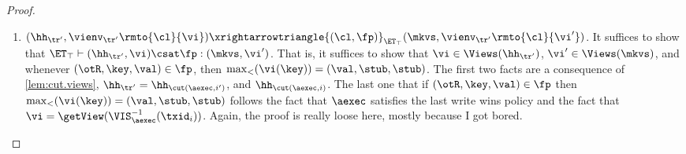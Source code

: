 \begin{proof}
\begin{itemize}
\begin{enumerate}
\begin{itemize}
\item There exists an index $j : 1 \leq j \leq i'$ and an integer $h \in \Nat$ such that $\txid_{j} = \txid_{\cl}^{h}$. 
Without loss of generality, let $j$ be the largest such index. 
It follows that the last transition in $\tr'$ of the form $(\stub, \stub) \xrightarrow{(\cl, \fp_{j})} (\stub, \vienv_{\mathsf{pre}})$ 
is such that $\vienv_{\mathsf{pre}}(\cl) = \getView(\aexec, \T_{\mathsf{pre}})$, 
for some $\T_{\mathsf{pre}} \subseteq \VIS^{-1}_{\aexec}(\txid_{i}) \cap (\AR^{-1}_{\aexec})?(\txid_{j})$.
This is because $\nextTx(\cl, \aexec, j)$  is defined and equal to $\txid_{i}$. 
Furthermore, because the trace $\tr'$ is in normal form by construction, 
in $\tr'$ a transition of the form $(\stub, \stub) \xrightarrowtriangle{(\cl, \varepsilon)}_{\ET_{\top}} (\stub, \stub)$ 
is always followed by a transition of the form $(\stub, \stub) \xrightarrowtriangle{(\cl, \fp')}_{\ET_{\top}} (\stub, \stub)$. 
Because we assume that the last transition where client $\cl$ executes a transaction in $\tr'$ 
has the form $(\stub, \stub) \xrightarrowtriangle{(\cl, \fp_{j})}_{\ET_{\top}} (\stub, \vienv_{\mathsf{pre}})$, 
then the latter is also the last transition for client $\cl$ in $\tr'$ 
(i.e. including both execution of transactions and view updates). 
It follows that $\vienv_{\tr'}(\cl) = \vienv_{\mathsf{pre}}(\cl)$, and in particular 
$\vienv_{\tr'}(\cl) = \getView(\aexec, \T_{\mathsf{pre}})$. By definition, 
$\T_{\mathsf{pre}} \subseteq  \VIS^{-1}_{\aexec}(\txid_{i}) \cap (\AR^{-1}_{\aexec})?(\txid_{j}) 
\subseteq \VIS^{-1}_{\aexec}(\txid_{i})$. By  \cref{lem:getView.monotone}, 
we have that $\vienv_{\tr'}(\cl) = \getView(\aexec, \T_{\mathsf{pre}}) \viewleq 
\getView(\aexec, \VIS^{-1}_{\aexec}(\txid_{i})) = \vi$, as we wanted to prove.
\ac{Note: this is more a sketch, rather than a real proof. A Proposition giving an explicit form to the 
structure of any $\tr \in \KVtrace(\ET_{\top}, \aexec)$ would be helpful for a more rigorous proof here.}
\end{itemize}


\item $(\hh_{\tr'}, \vienv_{\tr'}\rmto{\cl}{\vi}) \xrightarrowtriangle{(\cl, \fp)}_{\ET_{\top}} (\mkvs,  \vienv_{\tr'}\rmto{\cl}{\vi'})$. 
    It suffices to show that $\ET_{\top} \vdash (\hh_{\tr'}, \vi) \csat \fp: (\mkvs,\vi')$. 
That is, it suffices to show that $\vi \in \Views(\hh_{\tr'})$, $\vi' \in \Views(\mkvs)$, 
and whenever $(\otR, \key, \val) \in \fp$, then $\max_{<}(\vi(\key)) = (\val, \stub, \stub)$. 
The first two facts are a consequence of \cref{lem:cut.views}, $\hh_{\tr'} = \hh_{\cut(\aexec, i')}$, and  $\hh_{\cut(\aexec, i)}$. 
The last one that if $(\otR, \key, \val) \in \fp$ then $\max_{<}(\vi(\key)) = (\val, \stub, \stub)$ follows the fact that 
$\aexec$ satisfies the last write wins policy and the fact that $\vi = \getView(\VIS^{-1}_{\aexec}(\txid_{i}))$.
\ac{Again, the proof is really loose here, mostly because I got bored.}
\end{enumerate} 

\end{itemize}
\end{proof}


